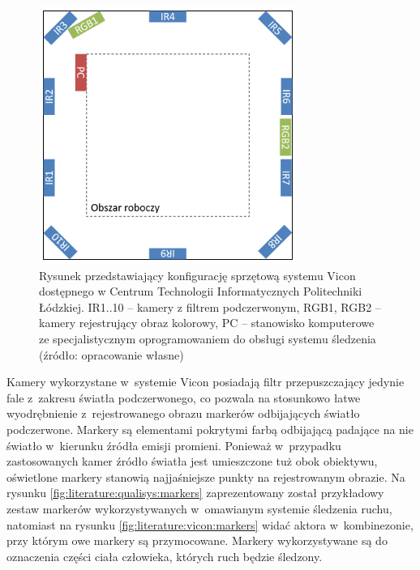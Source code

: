 \begin{savenotes}
									
	\begin{figure}[!htb]
		\centering	
		\includegraphics[width=0.75\textwidth]{images/viconSetup.png}
		\caption{Rysunek przedstawiający konfigurację sprzętową systemu Vicon dostępnego w Centrum Technologii Informatycznych Politechniki Łódzkiej. IR1..10 -- kamery z filtrem podczerwonym, RGB1, RGB2 -- kamery rejestrujący obraz kolorowy, PC -- stanowisko komputerowe ze specjalistycznym oprogramowaniem do obsługi systemu śledzenia (źródło: opracowanie własne)}
		\label{fig:literature:vicon:lutSetup}
	\end{figure}
								
\end{savenotes}
	
Kamery wykorzystane w~systemie Vicon posiadają filtr przepuszczający jedynie fale z~zakresu światła podczerwonego, co pozwala na stosunkowo łatwe wyodrębnienie z~rejestrowanego obrazu markerów odbijających światło podczerwone. Markery są elementami pokrytymi farbą odbijającą padające na nie światło w~kierunku źródła emisji promieni. Ponieważ w~przypadku zastosowanych kamer źródło światła jest umieszczone tuż obok obiektywu, oświetlone markery stanowią najjaśniejsze punkty na rejestrowanym obrazie. Na rysunku \ref{fig:literature:qualisys:markers} zaprezentowany został przykładowy zestaw markerów wykorzystywanych w~omawianym systemie śledzenia ruchu, natomiast na rysunku \ref{fig:literature:vicon:markers} widać aktora w~kombinezonie, przy którym owe markery są przymocowane. Markery wykorzystywane są do oznaczenia części ciała człowieka, których ruch będzie śledzony.
	

